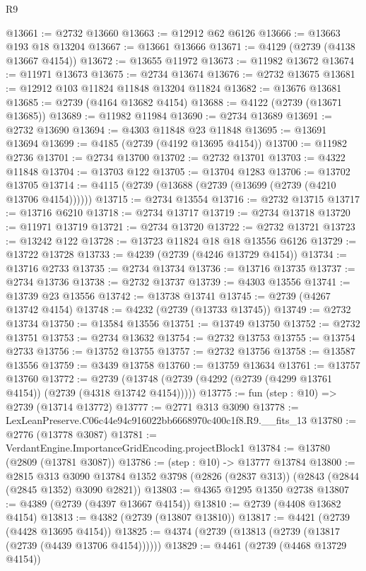 \begin{lexlean}{R9}
\begin{coremodule}
@13661 := @2732 @13660
@13663 := @12912 @62 @6126
@13666 := @13663 @193 @18 @13204
@13667 := @13661 @13666
@13671 := @4129 (@2739 (@4138 @13667 @4154))
@13672 := @13655 @11972
@13673 := @11982 @13672
@13674 := @11971 @13673
@13675 := @2734 @13674
@13676 := @2732 @13675
@13681 := @12912 @103 @11824 @11848 @13204 @11824
@13682 := @13676 @13681
@13685 := @2739 (@4164 @13682 @4154)
@13688 := @4122 (@2739 (@13671 @13685))
@13689 := @11982 @11984
@13690 := @2734 @13689
@13691 := @2732 @13690
@13694 := @4303 @11848 @23 @11848
@13695 := @13691 @13694
@13699 := @4185 (@2739 (@4192 @13695 @4154))
@13700 := @11982 @2736
@13701 := @2734 @13700
@13702 := @2732 @13701
@13703 := @4322 @11848
@13704 := @13703 @122
@13705 := @13704 @1283
@13706 := @13702 @13705
@13714 := @4115 (@2739 (@13688 (@2739 (@13699 (@2739 (@4210 @13706 @4154))))))
@13715 := @2734 @13554
@13716 := @2732 @13715
@13717 := @13716 @6210
@13718 := @2734 @13717
@13719 := @2734 @13718
@13720 := @11971 @13719
@13721 := @2734 @13720
@13722 := @2732 @13721
@13723 := @13242 @122
@13728 := @13723 @11824 @18 @18 @13556 @6126
@13729 := @13722 @13728
@13733 := @4239 (@2739 (@4246 @13729 @4154))
@13734 := @13716 @2733
@13735 := @2734 @13734
@13736 := @13716 @13735
@13737 := @2734 @13736
@13738 := @2732 @13737
@13739 := @4303 @13556
@13741 := @13739 @23 @13556
@13742 := @13738 @13741
@13745 := @2739 (@4267 @13742 @4154)
@13748 := @4232 (@2739 (@13733 @13745))
@13749 := @2732 @13734
@13750 := @13584 @13556
@13751 := @13749 @13750
@13752 := @2732 @13751
@13753 := @2734 @13632
@13754 := @2732 @13753
@13755 := @13754 @2733
@13756 := @13752 @13755
@13757 := @2732 @13756
@13758 := @13587 @13556
@13759 := @3439 @13758
@13760 := @13759 @13634
@13761 := @13757 @13760
@13772 := @2739 (@13748 (@2739 (@4292 (@2739 (@4299 @13761 @4154)) (@2739 (@4318 @13742 @4154)))))
@13775 := fun (step : @10) => @2739 (@13714 @13772)
@13777 := @2771 @313 @3090
@13778 := LexLeanPreserve.C06c44e94c916022bb6668970c400c1f8.R9.__fits_13
@13780 := @2776 (@13778 @3087)
@13781 := VerdantEngine.ImportanceGridEncoding.projectBlock1
@13784 := @13780 (@2809 (@13781 @3087))
@13786 := (step : @10) -> @13777 @13784
@13800 := @2815
    @313
    @3090
    @13784
    @1352
    @3798
    (@2826 (@2837 @313))
    (@2843 (@2844 (@2845 @1352) @3090 @2821))
@13803 := @4365 @1295 @1350 @2738
@13807 := @4389 (@2739 (@4397 @13667 @4154))
@13810 := @2739 (@4408 @13682 @4154)
@13813 := @4382 (@2739 (@13807 @13810))
@13817 := @4421 (@2739 (@4428 @13695 @4154))
@13825 := @4374 (@2739 (@13813 (@2739 (@13817 (@2739 (@4439 @13706 @4154))))))
@13829 := @4461 (@2739 (@4468 @13729 @4154))

\end{coremodule}
\end{lexlean}
